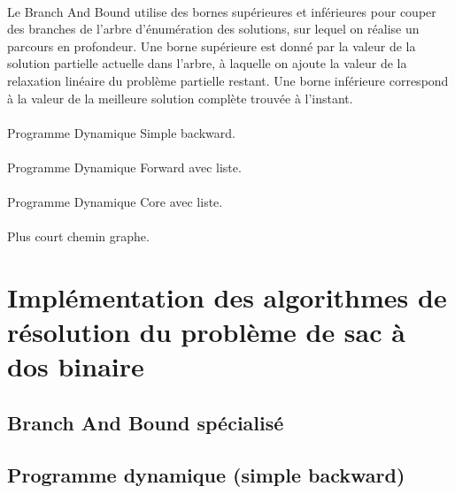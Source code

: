 \documentclass[12pt]{article}
\begin{document}
\paragraph{}Le Branch And Bound utilise des bornes supérieures et inférieures pour couper des branches de l'arbre d'énumération des solutions, sur lequel on réalise un parcours en profondeur. Une borne supérieure est donné par la valeur de la solution partielle actuelle dans l'arbre, à laquelle on ajoute la valeur de la relaxation linéaire du problème partielle restant. Une borne inférieure correspond à la valeur de la meilleure solution complète trouvée à l'instant.

\paragraph{}Programme Dynamique Simple backward.

\paragraph{}Programme Dynamique Forward avec liste.

\paragraph{}Programme Dynamique Core avec liste.

\paragraph{}Plus court chemin graphe.

\section{Implémentation des algorithmes de résolution du problème de sac à dos binaire}

\subsection{Branch And Bound spécialisé}

\paragraph{}

\subsection{Programme dynamique (simple backward)}
\end{document}
